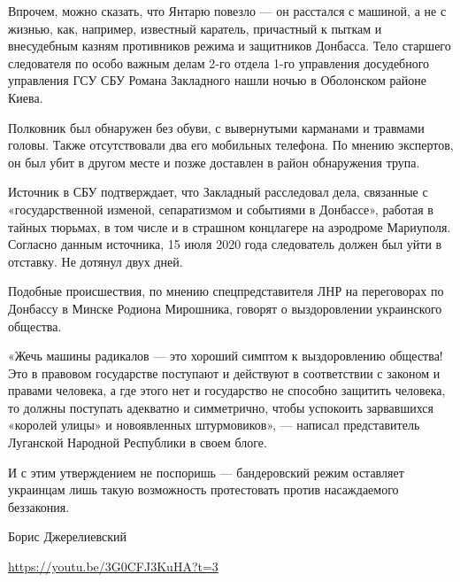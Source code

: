 Впрочем, можно сказать, что Янтарю повезло --- он расстался с машиной, а не с
жизнью, как, например, известный каратель, причастный к пыткам и внесудебным
казням противников режима и защитников Донбасса. Тело старшего следователя по
особо важным делам 2-го отдела 1-го управления досудебного управления ГСУ СБУ
Романа Закладного нашли ночью в Оболонском районе Киева.

Полковник был обнаружен без обуви, с вывернутыми карманами и травмами головы.
Также отсутствовали два его мобильных телефона. По мнению экспертов, он был
убит в другом месте и позже доставлен в район обнаружения трупа.

Источник в СБУ подтверждает, что Закладный расследовал дела, связанные с
«государственной изменой, сепаратизмом и событиями в Донбассе», работая в
тайных тюрьмах, в том числе и в страшном концлагере на аэродроме Мариуполя.
Согласно данным источника, 15 июля 2020 года следователь должен был уйти в
отставку. Не дотянул двух дней.

Подобные происшествия, по мнению спецпредставителя ЛНР на переговорах по
Донбассу в Минске Родиона Мирошника, говорят о выздоровлении украинского
общества.

«Жечь машины радикалов --- это хороший симптом к выздоровлению общества! Это в
правовом государстве поступают и действуют в соответствии с законом и правами
человека, а где этого нет и государство не способно защитить человека, то
должны поступать адекватно и симметрично, чтобы успокоить зарвавшихся «королей
улицы» и новоявленных штурмовиков», --- написал представитель Луганской Народной
Республики в своем блоге.

И с этим утверждением не поспоришь --- бандеровский режим оставляет украинцам
лишь такую возможность протестовать против насаждаемого беззакония.

Борис Джерелиевский

\url{https://youtu.be/3G0CFJ3KuHA?t=3}
